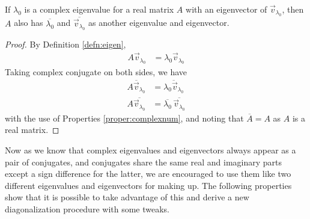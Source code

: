 \begin{proper}
\label{proper:eigenconj}
If $\lambda_0$ is a complex eigenvalue for a real matrix $A$ with an eigenvector of $\vec{v}_{\lambda_0}$, then $A$ also has $\overline{\lambda_0}$ and $\overline{\vec{v}_{\lambda_0}}$ as another eigenvalue and eigenvector.
\end{proper}
\begin{proof}
By Definition \ref{defn:eigen},
\begin{align*}
A\vec{v}_{\lambda_0} &= \lambda_0\vec{v}_{\lambda_0}    
\end{align*}
Taking complex conjugate on both sides, we have
\begin{align*}
\overline{A\vec{v}_{\lambda_0}} &= \overline{\lambda_0\vec{v}_{\lambda_0}} \\
A \overline{\vec{v}_{\lambda_0}} &= \overline{\lambda_0}\, \overline{\vec{v}_{\lambda_0}}
\end{align*}
with the use of Properties \ref{proper:complexnum}, and noting that $\overline{A} = A$ as $A$ is a real matrix.
\end{proof}
Now as we know that complex eigenvalues and eigenvectors always appear as a pair of  conjugates, and conjugates share the same real and imaginary parts except a sign difference for the latter, we are encouraged to use them like two different eigenvalues and eigenvectors for making up. The following properties show that it is possible to take advantage of this and derive a new diagonalization procedure with some tweaks.

